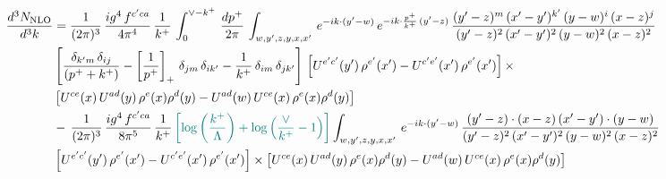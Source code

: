 \documentclass[9pt]{article}
\numberwithin{equation}{section}
\begin{document}
\begin{align}
    \frac{d^{3}N_{\rm NLO}}{d^{3}k} & = \frac{1}{(2\pi)^{3}}\, \frac{ig^{4}\,f^{c'ca}}{4\pi^{4}}\, \frac{1}{k^{+}}\,\int_{0}^{\vee-k^{+}}\, \frac{dp^{+}}{2\pi}\, \int_{w,y',z,y,x,x'}\, e^{-ik\cdot (y'-w)}\, e^{-ik\cdot \frac{p^{+}}{k^{+}}\,(y'-z)}\,\frac{(y'-z)^{m}\,(x'-y')^{k'}\,(y-w)^{i}\,(x-z)^{j}}{(y'-z)^{2}\,(x'-y')^{2}\,(y-w)^{2}\,(x-z)^{2}}\notag \\ & \left[\frac{\delta_{k'm}\,\delta_{ij}}{(p^{+}+k^{+})}-\left[\frac{1}{p^{+}}\right]_{+}\,\delta_{jm}\,\delta_{ik'}-\frac{1}{k^{+}}\, \delta_{im}\, \delta_{jk'}\right]\, \left[U^{e'c'}(y')\,\rho^{e'}(x')-U^{c'e'}(x')\,\rho^{e'}(x')\right]\times \notag \\ &  \left[U^{ce}(x)\,U^{ad}(y)\,\rho^{e}(x)\rho^{d}(y)-U^{ad}(w)\,U^{ce}(x)\,\rho^{e}(x)\rho^{d}(y)\right]\notag \\ & -\,\frac{1}{(2\pi)^{3}}\, \frac{ig^{4}\,f^{c'ca}}{8\pi^{5}}\, \frac{1}{k^{+}}\,{\color{teal}\left[\log{\left(\frac{k^{+}}{\Lambda}\right)}+\log{\left(\frac{\vee}{k^{+}}-1\right)}\right]} \int_{w,y',z,y,x,x'}\, e^{-ik\cdot (y'-w)}\,\frac{(y'-z)\cdot (x-z)\,(x'-y')\cdot (y-w)}{(y'-z)^{2}\,(x'-y')^{2}\,(y-w)^{2}\,(x-z)^{2}}\notag \\ & \left[U^{e'c'}(y')\,\rho^{e'}(x')-U^{c'e'}(x')\,\rho^{e'}(x')\right]\times  \left[U^{ce}(x)\,U^{ad}(y)\,\rho^{e}(x)\rho^{d}(y)-U^{ad}(w)\,U^{ce}(x)\,\rho^{e}(x)\rho^{d}(y)\right]
\end{align}
\end{document}
